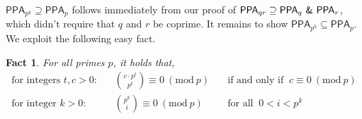 \documentclass[10pt,a4paper]{article}
\newtheorem{fact}[theorem]{Fact}
\theoremstyle{definition}
\theoremstyle{remark}
\newcommand{\inparen}[1]{\left ( #1 \right )}
\renewcommand{\mod}[1]{~\inparen{\mathrm{mod}~#1}}
\newcommand{\class}[1]{\ensuremath{\mathsf{#1}}\xspace}
\newcommand{\PPA}{\class{PPA}}
\newcommand{\bamp}{~\textsf{\upshape\&}~}
\begin{document}
$\PPA_{p^k} \supseteq \PPA_{p}$ follows immediately from our proof of $\PPA_{qr} \supseteq \PPA_q \bamp\PPA_r$, which didn't require that $q$ and $r$ be coprime. It remains to show $\PPA_{p^k} \subseteq \PPA_{p}$. We exploit the following easy fact.

\begin{fact}\label{fact:primes}
For all primes $p$, it holds that,\vspace*{-1mm}
\begin{align}
\text{for integers } t, c > 0: && \binom{c \cdot p^{t}}{p^t} \equiv 0 \mod{p} &\quad \text{if and only if }\ c \equiv 0 \mod{p}\label{eq:lucas-1}\\
\text{for integer } k > 0: && \binom{p^k}{i} \equiv 0 \mod{p} &\quad \text{for all }\ 0 < i < p^k\label{eq:lucas-2}
\end{align}

\end{fact}
\end{document}
